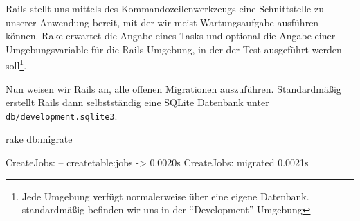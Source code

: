 Rails stellt uns mittels des Kommandozeilenwerkzeugs \textbf{} eine Schnittstelle zu unserer Anwendung bereit, mit der wir meist Wartungsaufgabe ausführen können. Rake erwartet die Angabe eines Tasks und optional die Angabe einer Umgebungsvariable für die Rails-Umgebung, in der der Test ausgeführt werden soll\footnote{Jede Umgebung verfügt normalerweise über eine eigene Datenbank. standardmäßig befinden wir uns in der "`Development"'-Umgebung}.


Nun weisen wir Rails an, alle offenen Migrationen auszuführen. Standardmäßig erstellt Rails dann selbstständig eine SQLite Datenbank unter \texttt{db/development.sqlite3}.


%                                                                                                                                                      
%                                                                                                                                                      
\begin{ruby}[label=Shell]
rake db:migrate

  CreateJobs:  
-- create\PYZus{}table:jobs
   -> 0.0020s
  CreateJobs: migrated 0.0021s 
\end{ruby}


